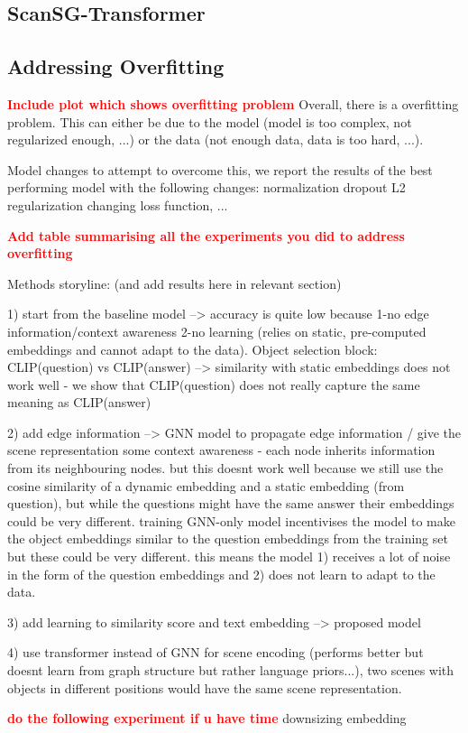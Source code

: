 \subsection{ScanSG-Transformer}


\subsection{Addressing Overfitting}


\textcolor{red}{\textbf{Include plot which shows overfitting problem}}
Overall, there is a overfitting problem. This can either be due to the model (model is too complex, not regularized enough, ...) or the data (not enough data, data is too hard, ...).

Model changes to attempt to overcome this, we report the results of the best performing model with the following changes: 
normalization
dropout
L2 regularization
changing loss function, ...


\textcolor{red}{\textbf{Add table summarising all the experiments you did to address overfitting}}

Methods storyline: (and add results here in relevant section)

1) start from the baseline model --> accuracy is quite low because 1-no edge information/context awareness 2-no learning (relies on static, pre-computed embeddings and cannot adapt to the data). Object selection block: CLIP(question) vs CLIP(answer) --> similarity with static embeddings does not work well - we show that CLIP(question) does not really capture the same meaning as CLIP(answer)

2) add edge information --> GNN model to propagate edge information / give the scene representation some context awareness - each node inherits information from its neighbouring nodes. but this doesnt work well because we still use the cosine similarity of a dynamic embedding and a static embedding (from question), but while the questions might have the same answer their embeddings could be very different. training GNN-only model incentivises the model to make the object embeddings  similar to the question embeddings from the training set but these could be very different. this means the model 1) receives a lot of noise in the form of the question embeddings and 2) does not learn to adapt to the data.

3) add learning to similarity score and text embedding --> proposed model

4) use transformer instead of GNN for scene encoding (performs better but doesnt learn from graph structure but rather language priors...), two scenes with objects in different positions would have the same scene representation.



\textcolor{red}{\textbf{do the following experiment if u have time}}
downsizing embedding